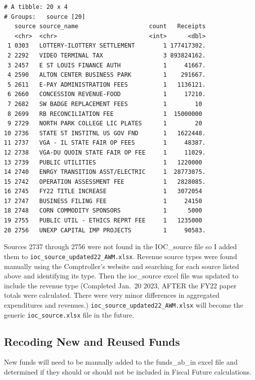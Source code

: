 \documentclass[
  letterpaper,
  DIV=11,
  numbers=noendperiod]{scrreport}
\begin{document}
\begin{verbatim}
# A tibble: 20 x 4
# Groups:   source [20]
   source source_name                    count   Receipts
   <chr>  <chr>                          <int>      <dbl>
 1 0303   LOTTERY-ILOTTERY SETTLEMENT        1 177417302.
 2 2292   VIDEO TERMINAL TAX                 3 893824162.
 3 2457   E ST LOUIS FINANCE AUTH            1     41667.
 4 2590   ALTON CENTER BUSINESS PARK         1    291667.
 5 2611   E-PAY ADMINISTRATION FEES          1   1136121.
 6 2660   CONCESSION REVENUE-FOOD            1     17210.
 7 2682   SW BADGE REPLACEMENT FEES          1        10 
 8 2699   RB RECONCILIATION FEE              1  15000000 
 9 2729   NORTH PARK COLLEGE LIC PLATES      1        20 
10 2736   STATE ST INSTITNL US GOV FND       1   1622448.
11 2737   VGA - IL STATE FAIR OP FEES        1     48387.
12 2738   VGA-DU QUOIN STATE FAIR OP FEE     1     11029.
13 2739   PUBLIC UTILITIES                   1   1220000 
14 2740   ENRGY TRANSITION ASST/ELECTRIC     1  28773075.
15 2742   OPERATION ASSESSMENT FEE           1   2828085.
16 2745   FY22 TITLE INCREASE                1   3072054 
17 2747   BUSINESS FILING FEE                1     24150 
18 2748   CORN COMMODITY SPONSORS            1      5000 
19 2755   PUBLIC UTIL - ETHICS REPRT FEE     1   1235000 
20 2756   UNEXP CAPITAL IMP PROJECTS         1     90583.
\end{verbatim}

Sources 2737 through 2756 were not found in the IOC\_source file so I
added them to \texttt{ioc\_source\_updated22\_AWM.xlsx}. Revenue source
types were found manually using the Comptroller's website and searching
for each source listed above and identifying its type. Then the
ioc\_source excel file was updated to include the revenue type
(Completed Jan.~20 2023, AFTER the FY22 paper totals were calculated.
There were very minor differences in aggregated expenditures and
revenues.) \texttt{ioc\_source\_updated22\_AWM.xlsx} will become the
generic \texttt{ioc\_source.xlsx} file in the future.

\hypertarget{recoding-new-and-reused-funds}{%
\subsection{Recoding New and Reused
Funds}\label{recoding-new-and-reused-funds}}

New funds will need to be manually added to the funds\_ab\_in excel file
and determined if they should or should not be included in Fiscal Future
calculations.
\end{document}
